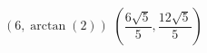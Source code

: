 { $\left( 6, \arctan(2) \right)$ }
{ $\left( \dfrac{6\sqrt{5}}{5}, \dfrac{12\sqrt{5}}{5} \right)$ }
